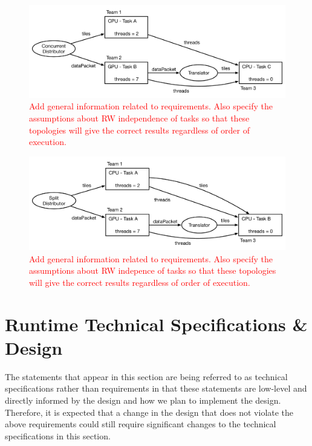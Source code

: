 \documentclass{article}
\begin{document}
\begin{figure}[!ht]
\begin{center}
\includegraphics[width=5.5in]{ConcurrentItorExample.pdf}
\caption[]{\textcolor{red}{Add general information related to requirements.
Also specify the assumptions about RW independence of tasks so that these
topologies will give the correct results regardless of order of execution.}}
\label{fig:ConcurrentItor}
\end{center}
\end{figure}

\begin{figure}[!ht]
\begin{center}
\includegraphics[width=5.5in]{WorkSplittingExample.pdf}
\caption[]{\textcolor{red}{Add general information related to requirements.
Also specify the assumptions about RW indepence of tasks so that these
topologies will give the correct results regardless of order of execution.}}
\label{fig:SplitItor}
\end{center}
\end{figure}

\section{Runtime Technical Specifications \& Design}
The statements that appear in this section are being referred to as technical
specifications rather than requirements in that these statements are low-level
and directly informed by the design and how we plan to implement the design.
Therefore, it is expected that a change in the design that does not violate the
above requirements could still require significant changes to the technical
specifications in this section.\\
\end{document}

